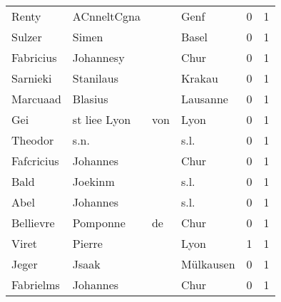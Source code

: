 \begin{tabular}{llllrr}
                    Renty &                        ACnneltCgna &             &                                        Genf &          0 &         1 \\
                   Sulzer &                              Simen &             &                                       Basel &          0 &         1 \\
                Fabricius &                          Johannesy &             &                                        Chur &          0 &         1 \\
                 Sarnieki &                          Stanilaus &             &                                      Krakau &          0 &         1 \\
                 Marcuaad &                            Blasius &             &                                    Lausanne &          0 &         1 \\
                      Gei &                      st liee  Lyon &         von &                                        Lyon &          0 &         1 \\
                  Theodor &                               s.n. &             &                                        s.l. &          0 &         1 \\
               Fafcricius &                           Johannes &             &                                        Chur &          0 &         1 \\
                     Bald &                            Joekinm &             &                                        s.l. &          0 &         1 \\
                     Abel &                           Johannes &             &                                        s.l. &          0 &         1 \\
                Bellievre &                           Pomponne &          de &                                        Chur &          0 &         1 \\
                    Viret &                             Pierre &             &                                        Lyon &          1 &         1 \\
                    Jeger &                              Jsaak &             &                                   Mülkausen &          0 &         1 \\
                Fabrielms &                           Johannes &             &                                        Chur &          0 &         1 \\

\end{tabular}
